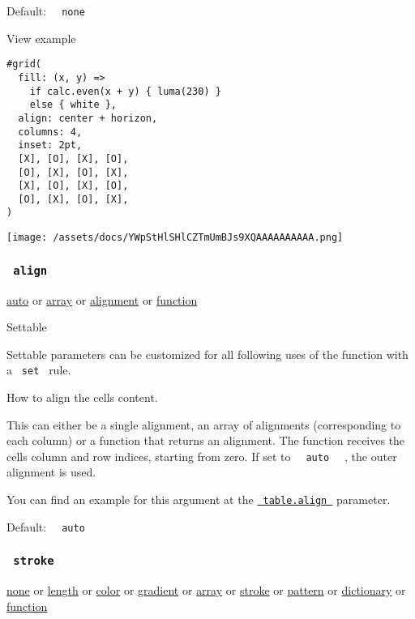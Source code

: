 Default: \texttt{\ }{\texttt{\ none\ }}\texttt{\ }


View example

\begin{verbatim}
#grid(
  fill: (x, y) =>
    if calc.even(x + y) { luma(230) }
    else { white },
  align: center + horizon,
  columns: 4,
  inset: 2pt,
  [X], [O], [X], [O],
  [O], [X], [O], [X],
  [X], [O], [X], [O],
  [O], [X], [O], [X],
)
\end{verbatim}

\texttt{[image: /assets/docs/YWpStHlSHlCZTmUmBJs9XQAAAAAAAAAA.png]}

\subsubsection{\texorpdfstring{\texttt{\ align\ }}{ align }}\label{parameters-align}

\href{/docs/reference/foundations/auto/}{auto} {or}
\href{/docs/reference/foundations/array/}{array} {or}
\href{/docs/reference/layout/alignment/}{alignment} {or}
\href{/docs/reference/foundations/function/}{function}

{{ Settable }}

\label{parameters-align-settable-tooltip}
Settable parameters can be customized for all following uses of the
function with a \texttt{\ set\ } rule.

How to align the cells\textquotesingle{} content.

This can either be a single alignment, an array of alignments
(corresponding to each column) or a function that returns an alignment.
The function receives the cells\textquotesingle{} column and row
indices, starting from zero. If set to
\texttt{\ }{\texttt{\ auto\ }}\texttt{\ } , the outer alignment is used.

You can find an example for this argument at the
\href{/docs/reference/model/table/\#parameters-align}{\texttt{\ table.align\ }}
parameter.

Default: \texttt{\ }{\texttt{\ auto\ }}\texttt{\ }

\subsubsection{\texorpdfstring{\texttt{\ stroke\ }}{ stroke }}\label{parameters-stroke}

\href{/docs/reference/foundations/none/}{none} {or}
\href{/docs/reference/layout/length/}{length} {or}
\href{/docs/reference/visualize/color/}{color} {or}
\href{/docs/reference/visualize/gradient/}{gradient} {or}
\href{/docs/reference/foundations/array/}{array} {or}
\href{/docs/reference/visualize/stroke/}{stroke} {or}
\href{/docs/reference/visualize/pattern/}{pattern} {or}
\href{/docs/reference/foundations/dictionary/}{dictionary} {or}
\href{/docs/reference/foundations/function/}{function}


